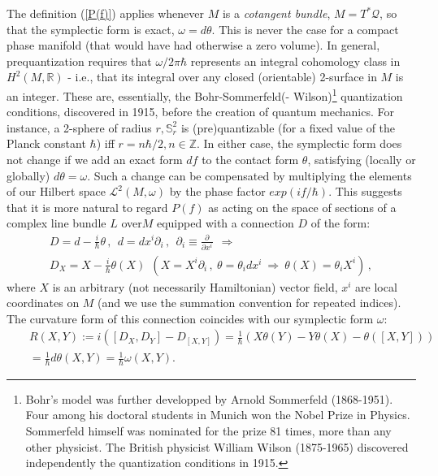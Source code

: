 \documentclass[12pt]{article}
\begin{document}
The definition (\ref{P(f)}) applies whenever $M$ is a {\it cotangent bundle}, 
$M = T^*\mathcal{Q}$, so that the symplectic form is exact, $\omega = d\theta$.
 This is never the case for a compact phase manifold (that would have had 
otherwise a zero volume). In general, prequantization requires that 
$\omega/{2\pi\hbar}$ represents an integral cohomology class in 
$H^2(M,\mathbb{R})$ - i.e., that its integral over any closed (orientable) 
2-surface in $M$ is an integer. These are, essentially, the Bohr-Sommerfeld(-
Wilson)\footnote{Bohr's model was further developped by Arnold Sommerfeld 
(1868-1951). Four among his doctoral students in Munich won the Nobel Prize in 
Physics. Sommerfeld himself was nominated for the prize 81 times, more than any
 other physicist. The British physicist William Wilson (1875-1965) discovered 
independently the quantization conditions in 1915.} quantization conditions, 
discovered in 1915, before the creation of quantum mechanics. For instance, a 
2-sphere of radius $r, {\mathbb S}_r^2$ is (pre)quantizable (for a fixed value 
of the Planck constant $\hbar$) iff $r = n\hbar/2, n\in \mathbb Z$. In either 
case, the symplectic form does not change if we add  an exact form $df$ to the 
contact form  $\theta$, satisfying (locally or globally) $d\theta = \omega$. 
Such a change can be compensated by multiplying the elements of our Hilbert 
space ${\mathcal L}^2(M, \omega)$ by the phase factor $exp(if/\hbar)$. This 
suggests that it is more natural to regard $P(f)$ as acting on the space of 
sections of a complex line bundle $L$ over$M$ equipped with a connection $D$ of 
the form:
\begin{eqnarray}
\label{D}
D = d-\frac{i}{\hbar} \theta\,, \ \ d = dx^i \partial_i\,, \ \ \partial_i 
\equiv \frac{\partial}{\partial{x^i}}\ \ \Rightarrow \nonumber \\
D_X = X - \frac{i}{\hbar} \theta(X) \ \ (X=X^i\partial_i\,,\ \theta=\theta_i 
dx^i\ \Rightarrow\ \theta(X)=\theta_i X^i)\,,
\end{eqnarray}
where $X$ is an arbitrary (not necessarily Hamiltonian) vector field, $x^i$ are
 local coordinates on $M$ (and we use the summation convention for repeated 
indices). The curvature form of this connection coincides with our symplectic 
form $\omega$:
\begin{eqnarray}
\label{RD}
&&R(X,Y):=i([D_X, D_Y]-D_{[X,Y]})=\frac{1}{\hbar}(X\theta(Y)-Y\theta(X)-
\theta([X, Y])) \nonumber \\ &&=\frac{1}{\hbar} d\theta(X,Y)= \frac{1}{\hbar} 
\omega(X,Y).
\end{eqnarray}
\end{document}
